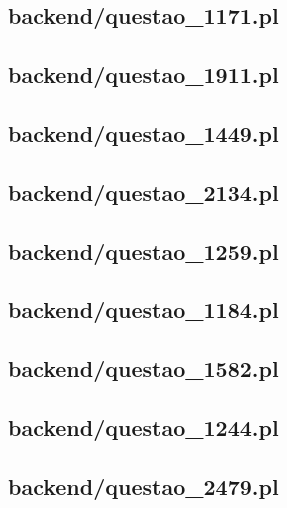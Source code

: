 \subsection*{backend/questao\_1171.pl}


\subsection*{backend/questao\_1911.pl}


\subsection*{backend/questao\_1449.pl}


\subsection*{backend/questao\_2134.pl}


\subsection*{backend/questao\_1259.pl}


\subsection*{backend/questao\_1184.pl}


\subsection*{backend/questao\_1582.pl}


\subsection*{backend/questao\_1244.pl}


\subsection*{backend/questao\_2479.pl}


